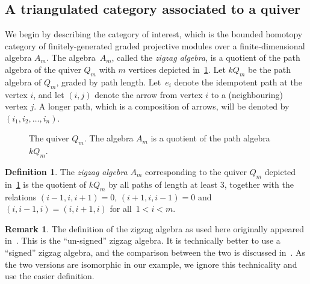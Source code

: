 \documentclass{amsart}
\theoremstyle{definition}
\newtheorem{definition}[theorem]{Definition}
\newtheorem{remark}[theorem]{Remark}
\newcommand{\darkblue}{\color{darkblue}} %
\newcommand{\defn}[1]{\textsl{\darkblue #1}} %
\begin{document}

\subsection{A triangulated category associated to a quiver}
\label{subsec:category}

We begin by describing the category of interest, which is the bounded homotopy category of finitely-generated graded projective modules over a finite-dimensional algebra \(A_m\). 
The algebra~\(A_m\), called the \defn{zigzag algebra}, is a quotient of the path algebra of the quiver \(Q_m\) with \(m\) vertices depicted in~\cref{fig:am-quiver}.
Let \(kQ_m\) be the path algebra of \(Q_m\), graded by path length.
Let~\(e_i\) denote the idempotent path at the vertex \(i\), and let \((i, j)\) denote the arrow from vertex \(i\) to a (neighbouring) vertex \(j\).
A longer path, which is a composition of arrows, will be denoted by~\((i_1, i_2, \dots, i_n)\).

\begin{figure}[h]
	\centering
	\caption{The quiver \(Q_m\). The algebra \(A_m\) is a quotient of the path algebra \(kQ_m\).}
	\label{fig:am-quiver}
\end{figure}

\begin{definition}
The \defn{zigzag algebra} \(A_m\) corresponding to the quiver \(Q_m\) depicted in~\cref{fig:am-quiver} is the quotient of \(kQ_m\) by all paths of length at least \(3\), together with the relations \((i-1, i, i+1) = 0\), \((i+1, i, i-1)=0\) and \((i, i-1, i) = (i, i+1, i)\) for all~\(1 < i < m\).
\end{definition}

\begin{remark}
The definition of the zigzag algebra as used here originally appeared in~\cite[Sect.~3]{hue.kho:01}.
This is the ``un-signed'' zigzag algebra.
It is technically better to use a ``signed'' zigzag algebra, and the comparison between the two is discussed in~\cite[Rem.~6.6]{bap.deo.lic:20}.
As the two versions are isomorphic in our example, we ignore this technicality and use the easier definition.
\end{remark}
\end{document}
